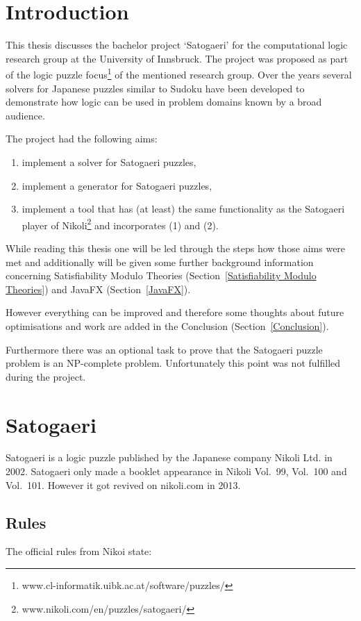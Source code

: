 \chapter{Introduction} \label{Introduction}
This thesis discusses the bachelor project `Satogaeri' for the computational logic research group at the University of Innsbruck. The project was proposed as part of the logic puzzle focus\footnote{www.cl-informatik.uibk.ac.at/software/puzzles/} of the mentioned research group. Over the years several solvers for Japanese puzzles similar to Sudoku have been developed to demonstrate how logic can be used in problem domains known by a broad audience.

The project had the following aims: 
\begin{enumerate}
	\item implement a solver for Satogaeri puzzles,
	\item implement a generator for Satogaeri puzzles,
	\item implement a tool that has (at least) the same functionality as the Satogaeri player of Nikoli\footnote{www.nikoli.com/en/puzzles/satogaeri/} and incorporates (1) and (2).
\end{enumerate}

While reading this thesis one will be led through the steps how those aims were met and additionally will be given some further background information concerning Satisfiability Modulo Theories (Section~\ref{Satisfiability Modulo Theories}) and JavaFX (Section~\ref{JavaFX}).

However everything can be improved and therefore some thoughts about future optimisations and work are added in the Conclusion (Section~\ref{Conclusion}).

Furthermore there was an optional task to prove that the Satogaeri puzzle problem is an NP-complete problem. Unfortunately this point was not fulfilled during the project.

\chapter{Satogaeri} \label{Satogaeri}
Satogaeri is a logic puzzle published by the Japanese company Nikoli Ltd. in 2002. Satogaeri only made a booklet appearance in Nikoli Vol.\ 99, Vol.\ 100 and Vol.\ 101. However it got revived on nikoli.com in 2013.

\section{Rules}
The official rules from Nikoi state:


